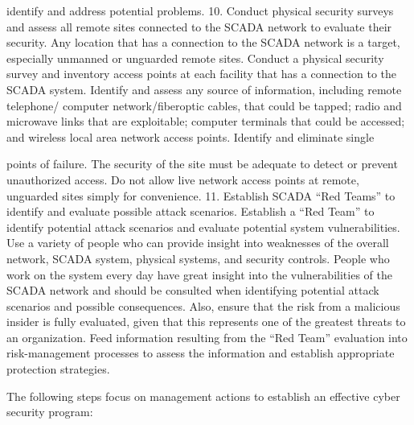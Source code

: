 \documentclass{article}
\begin{document}
identify and address potential problems. 10. Conduct physical security
surveys and assess all remote sites connected to the SCADA network to
evaluate their security. Any location that has a connection to the SCADA
network is a target, especially unmanned or unguarded remote sites.
Conduct a physical security survey and inventory access points at each
facility that has a connection to the SCADA system. Identify and assess
any source of information, including remote telephone/ computer
network/fiberoptic cables, that could be tapped; radio and microwave
links that are exploitable; computer terminals that could be accessed;
and wireless local area network access points. Identify and eliminate
single

points of failure. The security of the site must be adequate to detect
or prevent unauthorized access. Do not allow live network access points
at remote, unguarded sites simply for convenience. 11. Establish SCADA
``Red Teams'' to identify and evaluate possible attack scenarios.
Establish a ``Red Team'' to identify potential attack scenarios and
evaluate potential system vulnerabilities. Use a variety of people who
can provide insight into weaknesses of the overall network, SCADA
system, physical systems, and security controls. People who work on the
system every day have great insight into the vulnerabilities of the
SCADA network and should be consulted when identifying potential attack
scenarios and possible consequences. Also, ensure that the risk from a
malicious insider is fully evaluated, given that this represents one of
the greatest threats to an organization. Feed information resulting from
the ``Red Team'' evaluation into risk-management processes to assess the
information and establish appropriate protection strategies.

The following steps focus on management actions to establish an
effective cyber security program:
\end{document}
